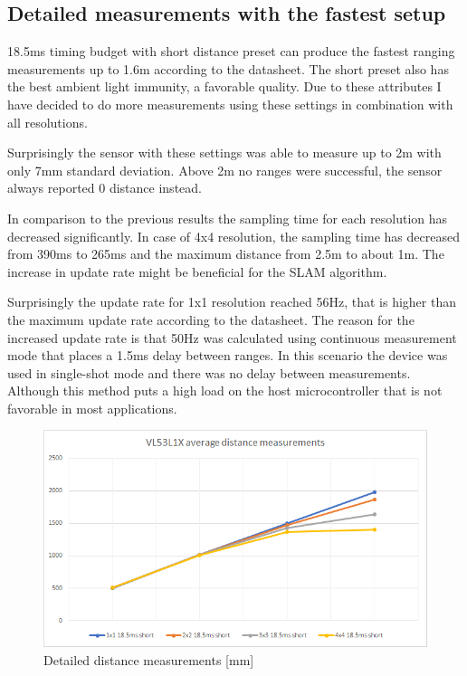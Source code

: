 \subsection{Detailed measurements with the fastest setup}
18.5ms timing budget with short distance preset can produce the fastest ranging measurements 
up to 1.6m according to the datasheet. The short preset also has the best ambient light 
immunity, a favorable quality. Due to these attributes I have decided to do more measurements
using these settings in combination with all resolutions.

Surprisingly the sensor with these settings was able to measure up to 2m with only 7mm 
standard deviation. Above 2m no ranges were successful, the sensor always reported 0 distance 
instead.

In comparison to the previous results the sampling time for each resolution has decreased 
significantly. In case of 4x4 resolution, the sampling time has decreased from 390ms to
265ms and the maximum distance from 2.5m to about 1m. The increase in update rate might be 
beneficial for the SLAM algorithm.

Surprisingly the update rate for 1x1 resolution reached 56Hz, that is higher than the 
maximum update rate according to the datasheet. The reason for the increased update rate
is that 50Hz was calculated using continuous measurement mode that places a 1.5ms delay
between ranges. In this scenario the device was used in single-shot mode and there was 
no delay between measurements. Although this method puts a high load on the host 
microcontroller that is not favorable in most applications.



\begin{figure}[!h]
    \centering
	\includegraphics[width=115mm, keepaspectratio]{figures/vl53l1x_measurements_03_dist.png}
    \caption{Detailed distance measurements [mm]}
    \label{fig:vl53l1x_meas_detailed_dist}
\end{figure}

